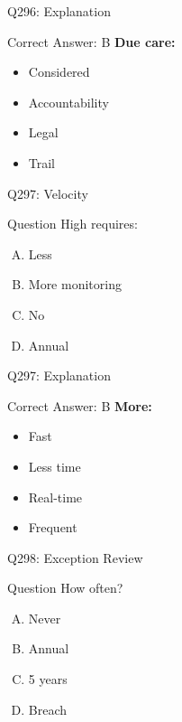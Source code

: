 \documentclass{beamer}
\begin{document}
	\begin{frame}{Q296: Explanation}
		\begin{block}{Correct Answer: B}
			\textbf{Due care:}
			\begin{itemize}
				\item Considered
				\item Accountability
				\item Legal
				\item Trail
			\end{itemize}
		\end{block}
	\end{frame}
	
	\begin{frame}{Q297: Velocity}
		\begin{block}{Question}
			High requires:
		\end{block}
		\begin{enumerate}[(A)]
			\item Less
			\item More monitoring
			\item No
			\item Annual
		\end{enumerate}
	\end{frame}
	
	\begin{frame}{Q297: Explanation}
		\begin{block}{Correct Answer: B}
			\textbf{More:}
			\begin{itemize}
				\item Fast
				\item Less time
				\item Real-time
				\item Frequent
			\end{itemize}
		\end{block}
	\end{frame}
	
	\begin{frame}{Q298: Exception Review}
		\begin{block}{Question}
			How often?
		\end{block}
		\begin{enumerate}[(A)]
			\item Never
			\item Annual
			\item 5 years
			\item Breach
		\end{enumerate}
	\end{frame}
	
\end{document}
